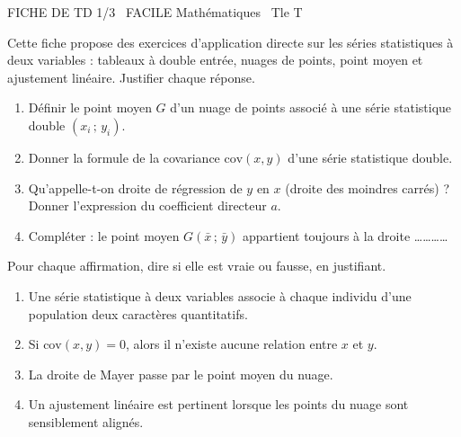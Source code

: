 \documentclass[11pt]{article}
\begin{document}
\begin{tcolorbox}[enhanced,colback=popink,colframe=popink,arc=10pt,boxrule=0pt,left=12pt,right=12pt,top=9pt,bottom=9pt]
{\color{white}\popxbold\small FICHE DE TD 1/3 \textbullet\ FACILE \hfill Mathématiques \textbullet\ Tle T\par}
\end{tcolorbox}
\vspace{4pt}
Cette fiche propose des exercices d'application directe sur les séries statistiques à deux variables : tableaux à double entrée, nuages de points, point moyen et ajustement linéaire. Justifier chaque réponse.

\begin{exercice}
\begin{enumerate}
\item Définir le point moyen $G$ d'un nuage de points associé à une série statistique double $(x_i\,;\,y_i)$.
\item Donner la formule de la covariance $\mathrm{cov}(x,y)$ d'une série statistique double.
\item Qu'appelle-t-on droite de régression de $y$ en $x$ (droite des moindres carrés) ? Donner l'expression du coefficient directeur $a$.
\item Compléter : le point moyen $G(\bar{x}\,;\,\bar{y})$ appartient toujours à la droite \ldots\ldots\ldots\ldots
\end{enumerate}
\end{exercice}

\begin{exercice}
Pour chaque affirmation, dire si elle est vraie ou fausse, en justifiant.
\begin{enumerate}
\item Une série statistique à deux variables associe à chaque individu d'une population deux caractères quantitatifs.
\item Si $\mathrm{cov}(x,y) = 0$, alors il n'existe aucune relation entre $x$ et $y$.
\item La droite de Mayer passe par le point moyen du nuage.
\item Un ajustement linéaire est pertinent lorsque les points du nuage sont sensiblement alignés.
\end{enumerate}
\end{exercice}
\end{document}
